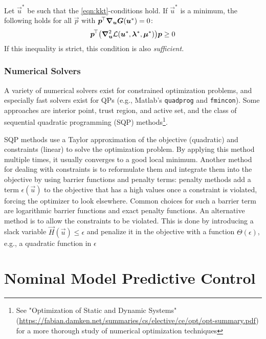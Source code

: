 			\begin{theorem}
				Let \(\vec{u}^\ast\) be such that the \ref{eqn:kkt}-conditions hold. If \(\vec{u}^\ast\) is a minimum, the following holds for all \(\vec{p}\) with \( \bm{p}^{\!\top} \grad_{\bm{u}} \bm{G}(\bm{u}^\ast) = 0 \):
				\begin{equation}
					\bm{p}^{\!\top} \bigl( \grad_{\bm{u}}^2 \mathcal{L}(\bm{u}^\ast, \bm{\lambda}^\ast, \bm{\mu}^\ast) \bigr) \bm{p} \geq 0
				\end{equation}
				If this inequality is strict, this condition is also \emph{sufficient.}
			\end{theorem}

		\subsection{Numerical Solvers}
			A variety of numerical solvers exist for constrained optimization problems, and especially fast solvers exist for QPs (e.g., Matlab's \texttt{quadprog} and \texttt{fmincon}). Some approaches are interior point, trust region, and active set, and the class of sequential quadratic programming (SQP) methods\footnote{See "Optimization of Static and Dynamic Systems" (\url{https://fabian.damken.net/summaries/cs/elective/ce/opt/opt-summary.pdf}) for a more thorough study of numerical optimization techniques}.

			SQP methods use a Taylor approximation of the objective (quadratic) and constraints (linear) to solve the optimization problem. By applying this method multiple times, it usually converges to a good local minimum. Another method for dealing with constraints is to reformulate them and integrate them into the objective by using barrier functions and penalty terms: penalty methods add a term \(\epsilon(\vec{u})\) to the objective that has a high values once a constraint is violated, forcing the optimizer to look elsewhere. Common choices for such a barrier term are logarithmic barrier functions and exact penalty functions. An alternative method is to allow the constraints to be violated. This is done by introducing a slack variable \( \vec{H}(\vec{u}) \leq \epsilon \) and penalize it in the objective with a function \( \Theta(\epsilon) \), e.g., a quadratic function in \(\epsilon\)


\chapter{Nominal Model Predictive Control}
	\label{c:mpcNominal}


